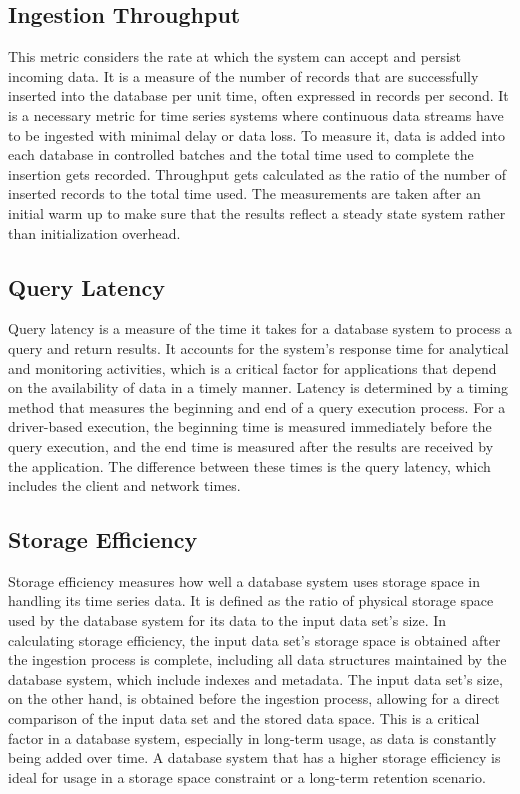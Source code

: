 \subsection{Ingestion Throughput}
This metric considers the rate at which the system can accept and persist incoming data. It is a measure of the number of records that are successfully inserted into the database per unit time, often expressed in records per second. It is a necessary metric for time series systems where continuous data streams have to be ingested with minimal delay or data loss. To measure it, data is added into each database in controlled batches and the total time used to complete the insertion gets recorded. Throughput gets calculated as the ratio of the number of inserted records to the total time used. The measurements are taken after an initial warm up to make sure that the results reflect a steady state system rather than initialization overhead.


\subsection{Query Latency}
Query latency is a measure of the time it takes for a database system to process a query and return results. It accounts for the system's response time for analytical and monitoring activities, which is a critical factor for applications that depend on the availability of data in a timely manner. Latency is determined by a timing method that measures the beginning and end of a query execution process. For a driver-based execution, the beginning time is measured immediately before the query execution, and the end time is measured after the results are received by the application. The difference between these times is the query latency, which includes the client and network times.


\subsection{Storage Efficiency}
Storage efficiency measures how well a database system uses storage space in handling its time series data. It is defined as the ratio of physical storage space used by the database system for its data to the input data set's size. In calculating storage efficiency, the input data set's storage space is obtained after the ingestion process is complete, including all data structures maintained by the database system, which include indexes and metadata. The input data set's size, on the other hand, is obtained before the ingestion process, allowing for a direct comparison of the input data set and the stored data space. This is a critical factor in a database system, especially in long-term usage, as data is constantly being added over time. A database system that has a higher storage efficiency is ideal for usage in a storage space constraint or a long-term retention scenario.

